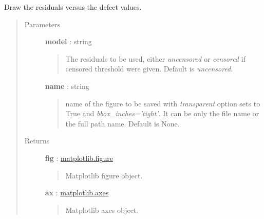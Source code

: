 \documentclass[letterpaper,10pt,english]{sphinxmanual}
\begin{document}
\begin{fulllineitems}
\begin{fulllineitems}
\begin{quote}
\begin{description}
\end{description}\end{quote}

\end{fulllineitems}


\begin{fulllineitems}
\label{_generated/otpod.UnivariateLinearModelAnalysis:otpod.UnivariateLinearModelAnalysis.drawResiduals}
Draw the residuals versus the defect values.
\begin{quote}\begin{description}
\item[{Parameters}] \leavevmode
\textbf{model} : string
\begin{quote}

The residuals to be used, either \emph{uncensored} or
\emph{censored} if censored threshold were given. Default is \emph{uncensored}.
\end{quote}

\textbf{name} : string
\begin{quote}

name of the figure to be saved with \emph{transparent} option sets to True
and \emph{bbox\_inches='tight'}. It can be only the file name or the 
full path name. Default is None.
\end{quote}

\item[{Returns}] \leavevmode
\textbf{fig} : \href{http://matplotlib.org/api/figure\_api.html}{matplotlib.figure}
\begin{quote}

Matplotlib figure object.
\end{quote}

\textbf{ax} : \href{http://matplotlib.org/api/axes\_api.html}{matplotlib.axes}
\begin{quote}

Matplotlib axes object.
\end{quote}

\end{description}\end{quote}

\end{fulllineitems}



\end{fulllineitems}
\end{document}
